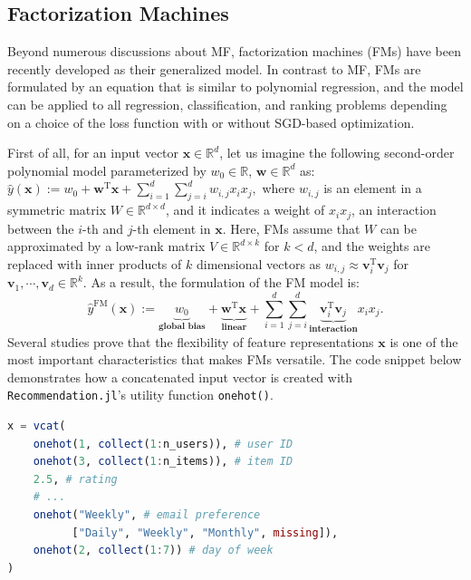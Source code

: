 \subsection{Factorization Machines}

Beyond numerous discussions about MF, factorization machines (FMs) have been recently developed as their generalized model. In contrast to MF, FMs are formulated by an equation that is similar to polynomial regression, and the model can be applied to all regression, classification, and ranking problems depending on a choice of the loss function with or without SGD-based optimization.

First of all, for an input vector $\mathbf{x} \in \mathbb{R}^d$, let us imagine the following second-order polynomial model parameterized by $w_0 \in \mathbb{R}$, $\mathbf{w} \in \mathbb{R}^d$ as: $\hat{y}(\mathbf{x}) := w_0 + \mathbf{w}^{\mathrm{T}} \mathbf{x} + \sum_{i=1}^d \sum_{j=i}^d w_{i,j} x_i x_j,$ where $w_{i,j}$ is an element in a symmetric matrix $W \in \mathbb{R}^{d \times d}$, and it indicates a weight of $x_i x_j$, an interaction between the $i$-th and $j$-th element in $\mathbf{x}$. Here, FMs assume that $W$ can be approximated by a low-rank matrix $V \in \mathbb{R}^{d \times k}$ for $k < d$, and the weights are replaced with inner products of $k$ dimensional vectors as $w_{i, j} \approx \mathbf{v}_i^{\mathrm{T}} \mathbf{v}_j$ for $\mathbf{v}_1, \cdots, \mathbf{v}_d \in \mathbb{R}^k$. As a result, the formulation of the FM model is:
\begin{equation}
\hat{y}^{\mathrm{FM}}(\mathbf{x}) := \underbrace{w_0}_{\textbf{global bias}} + \underbrace{\mathbf{w}^{\mathrm{T}} \mathbf{x}_{ }}_{\textbf{linear}} + \sum_{i=1}^d \sum_{j=i}^d \underbrace{\mathbf{v}_i^{\mathrm{T}} \mathbf{v}_j}_{\textbf{interaction}} x_i x_j.
\label{eq:FMs}
\end{equation}
Several studies \cite{Geuens2015,Rendle2012-1,Rendle2012-3} prove that the flexibility of feature representations $\mathbf{x}$ is one of the most important characteristics that makes FMs versatile. The code snippet below demonstrates how a concatenated input vector is created with \texttt{Recommendation.jl}'s utility function \texttt{onehot()}.

\begin{lstlisting}[language = Julia]
x = vcat(
    onehot(1, collect(1:n_users)), # user ID
    onehot(3, collect(1:n_items)), # item ID
    2.5, # rating
    # ...
    onehot("Weekly", # email preference
          ["Daily", "Weekly", "Monthly", missing]),
    onehot(2, collect(1:7)) # day of week
)
\end{lstlisting}


